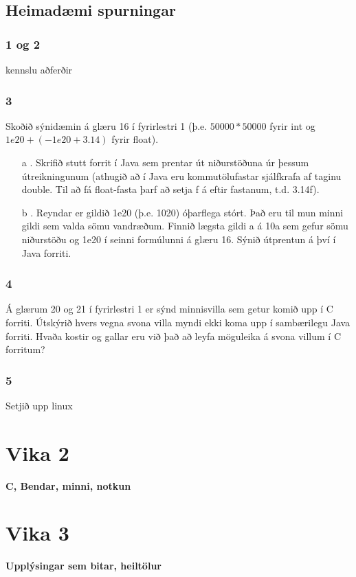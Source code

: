\documentclass{article}
\begin{document}
\subsection{Heimadæmi spurningar}

\subsubsection{1 og 2}
kennslu aðferðir

\subsubsection{3}
Skoðið sýnidæmin á glæru 16 í fyrirlestri 1 (þ.e. $50000 * 50000$ fyrir int og $1e20 +
(-1e20 + 3.14)$ fyrir float).
\begin{itemize}
    \item[a]. Skrifið stutt forrit í Java sem prentar út niðurstöðuna úr þessum útreikningunum
(athugið að í Java eru kommutölufastar sjálfkrafa af taginu double. Til að fá
float-fasta þarf að setja f á eftir fastanum, t.d. 3.14f).
\item[b] . Reyndar er gildið 1e20 (þ.e. 1020) óþarflega stórt. Það eru til mun minni gildi
sem valda sömu vandræðum. Finnið lægsta gildi a á 10a sem gefur sömu
niðurstöðu og 1e20 í seinni formúlunni á glæru 16. Sýnið útprentun á því í Java
forriti.
\end{itemize}

\subsubsection{4}
Á glærum 20 og 21 í fyrirlestri 1 er sýnd minnisvilla sem getur komið upp í C forriti.
Útskýrið hvers vegna svona villa myndi ekki koma upp í sambærilegu Java forriti.
Hvaða kostir og gallar eru við það að leyfa möguleika á svona villum í C forritum?

\subsubsection{5}
Setjið upp linux



\newpage
\section{Vika 2}
\large{\textbf{C, Bendar, minni, notkun}}

\newpage
\section{Vika 3}
\large{\textbf{Upplýsingar sem bitar, heiltölur}}
\end{document}
